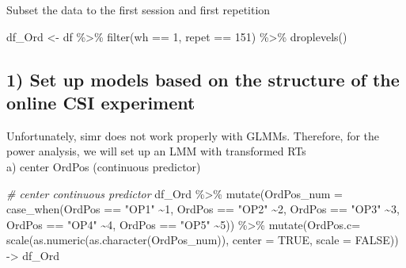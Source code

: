 \documentclass[
]{article}
\newenvironment{Shaded}{\begin{snugshade}}{\end{snugshade}}
\newcommand{\AttributeTok}[1]{\textcolor[rgb]{0.77,0.63,0.00}{#1}}
\newcommand{\CommentTok}[1]{\textcolor[rgb]{0.56,0.35,0.01}{\textit{#1}}}
\newcommand{\ConstantTok}[1]{\textcolor[rgb]{0.00,0.00,0.00}{#1}}
\newcommand{\DecValTok}[1]{\textcolor[rgb]{0.00,0.00,0.81}{#1}}
\newcommand{\FunctionTok}[1]{\textcolor[rgb]{0.00,0.00,0.00}{#1}}
\newcommand{\NormalTok}[1]{#1}
\newcommand{\OtherTok}[1]{\textcolor[rgb]{0.56,0.35,0.01}{#1}}
\newcommand{\SpecialCharTok}[1]{\textcolor[rgb]{0.00,0.00,0.00}{#1}}
\newcommand{\StringTok}[1]{\textcolor[rgb]{0.31,0.60,0.02}{#1}}
\begin{document}
Subset the data to the first session and first repetition

\begin{Shaded}
\begin{Highlighting}[]
\NormalTok{df\_Ord }\OtherTok{\textless{}{-}}\NormalTok{ df }\SpecialCharTok{\%\textgreater{}\%} \FunctionTok{filter}\NormalTok{(wh }\SpecialCharTok{==} \DecValTok{1}\NormalTok{, repet }\SpecialCharTok{==} \DecValTok{151}\NormalTok{) }\SpecialCharTok{\%\textgreater{}\%} \FunctionTok{droplevels}\NormalTok{()}
\end{Highlighting}
\end{Shaded}

\hypertarget{set-up-models-based-on-the-structure-of-the-online-csi-experiment}{%
\subsection{1) Set up models based on the structure of the online CSI
experiment}\label{set-up-models-based-on-the-structure-of-the-online-csi-experiment}}

Unfortunately, simr does not work properly with GLMMs. Therefore, for
the power analysis, we will set up an LMM with transformed RTs\\
a) center OrdPos (continuous predictor)

\begin{Shaded}
\begin{Highlighting}[]
\CommentTok{\# center continuous predictor}
\NormalTok{df\_Ord }\SpecialCharTok{\%\textgreater{}\%} \FunctionTok{mutate}\NormalTok{(}\AttributeTok{OrdPos\_num =} \FunctionTok{case\_when}\NormalTok{(OrdPos }\SpecialCharTok{==} \StringTok{"OP1"} \SpecialCharTok{\textasciitilde{}}\DecValTok{1}\NormalTok{,}
\NormalTok{                                         OrdPos }\SpecialCharTok{==} \StringTok{"OP2"} \SpecialCharTok{\textasciitilde{}}\DecValTok{2}\NormalTok{,}
\NormalTok{                                         OrdPos }\SpecialCharTok{==} \StringTok{"OP3"} \SpecialCharTok{\textasciitilde{}}\DecValTok{3}\NormalTok{,}
\NormalTok{                                         OrdPos }\SpecialCharTok{==} \StringTok{"OP4"} \SpecialCharTok{\textasciitilde{}}\DecValTok{4}\NormalTok{,}
\NormalTok{                                         OrdPos }\SpecialCharTok{==} \StringTok{"OP5"} \SpecialCharTok{\textasciitilde{}}\DecValTok{5}\NormalTok{)) }\SpecialCharTok{\%\textgreater{}\%}
                  \FunctionTok{mutate}\NormalTok{(}\AttributeTok{OrdPos.c=}
                    \FunctionTok{scale}\NormalTok{(}\FunctionTok{as.numeric}\NormalTok{(}\FunctionTok{as.character}\NormalTok{(OrdPos\_num)), }
                     \AttributeTok{center =} \ConstantTok{TRUE}\NormalTok{, }\AttributeTok{scale =} \ConstantTok{FALSE}\NormalTok{)) }\OtherTok{{-}\textgreater{}}\NormalTok{ df\_Ord}
\end{Highlighting}
\end{Shaded}
\end{document}
